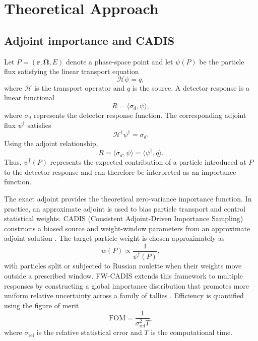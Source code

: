 \documentclass[a4paper,fleqn]{cas-sc}
\let\Oldsubsection\subsection
\renewcommand{\subsection}{\FloatBarrier\Oldsubsection}
\begin{document}
\FloatBarrier



\section{Theoretical Approach}\label{sec:methods}

\subsection{Adjoint importance and CADIS}\label{sec:theory}

Let $P=(\mathbf r,\mathbf\Omega,E)$ denote a phase-space point and let $\psi(P)$ be the particle flux satisfying the linear transport equation
\begin{equation}
\mathcal{H}\psi=q,
\end{equation}
where $\mathcal{H}$ is the transport operator and $q$ is the source. A detector response is a linear functional
\begin{equation}
R=\langle \sigma_d,\psi\rangle ,
\end{equation}
where $\sigma_d$ represents the detector response function. The corresponding adjoint flux $\psi^\dagger$ satisfies
\begin{equation}
\mathcal{H}^{\dagger}\psi^\dagger=\sigma_d .
\label{eq:adjoint}
\end{equation}
Using the adjoint relationship,
\begin{equation}
R=\langle \sigma_d,\psi\rangle
=\langle \psi^\dagger,q\rangle .
\label{eq:fund}
\end{equation}
Thus, $\psi^\dagger(P)$ represents the expected contribution of a particle introduced at $P$ to the detector response and can therefore be interpreted as an importance function.

The exact adjoint provides the theoretical zero-variance importance function. In practice, an approximate adjoint is used to bias particle transport and control statistical weights. CADIS (Consistent Adjoint-Driven Importance Sampling) constructs a biased source and weight-window parameters from an approximate adjoint solution \cite{wagner1998,haghighat2003}. The target particle weight is chosen approximately as
\begin{equation}
w(P)\propto \frac{1}{\psi^\dagger(P)},
\end{equation}
with particles split or subjected to Russian roulette when their weights move outside a prescribed window. FW-CADIS extends this framework to multiple responses by constructing a global importance distribution that promotes more uniform relative uncertainty across a family of tallies \cite{wagnerfw2014,cooper2001}. Efficiency is quantified using the figure of merit
\begin{equation}
\mathrm{FOM}=\frac{1}{\sigma_{\mathrm{rel}}^2T},
\label{eq:fom}
\end{equation}
where $\sigma_{\mathrm{rel}}$ is the relative statistical error and $T$ is the computational time.
\end{document}
